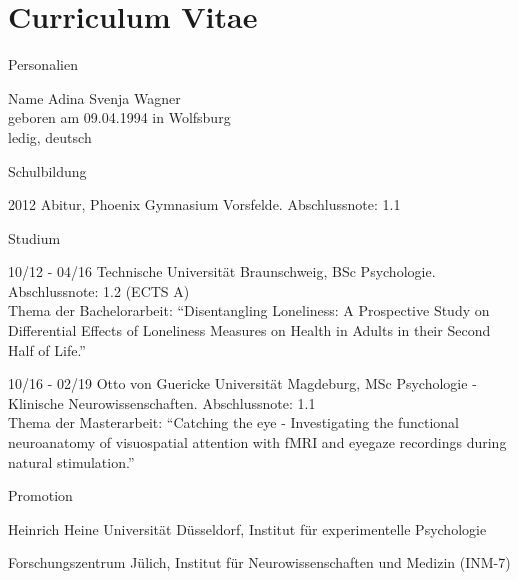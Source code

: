 
\chapter*{Curriculum Vitae}


\begin{cv}{}
\begin{cvlist}{Personalien}
	\item[Name]
		Adina Svenja Wagner \\
		geboren am 09.04.1994 in Wolfsburg \\
		ledig, deutsch
\end{cvlist}
%
\begin{cvlist}{Schulbildung}
	\item[2012] Abitur, Phoenix Gymnasium Vorsfelde. Abschlussnote: 1.1
\end{cvlist}
%
\begin{cvlist}{Studium}
	\item[10/12 - 04/16] Technische Universität Braunschweig, BSc Psychologie. Abschlussnote: 1.2 (ECTS A)
	\\[0.5\baselineskip]
    Thema der Bachelorarbeit: \enquote{Disentangling Loneliness: A Prospective Study on Differential Effects of
	Loneliness Measures on Health in Adults in their Second Half of Life.}
	\item[10/16 - 02/19] Otto von Guericke Universität Magdeburg, MSc Psychologie - Klinische Neurowissenschaften. Abschlussnote: 1.1 
	\\[0.5\baselineskip]
	Thema der Masterarbeit: \enquote{Catching the eye - Investigating the functional neuroanatomy of visuospatial
	attention with fMRI and eyegaze recordings during natural stimulation.}
\end{cvlist}
%
\begin{cvlist}{Promotion}
	\item Heinrich Heine Universität Düsseldorf, Institut für experimentelle Psychologie
	\item Forschungszentrum Jülich, Institut für Neurowissenschaften und Medizin (INM-7)
\end{cvlist}

\end{cv}
